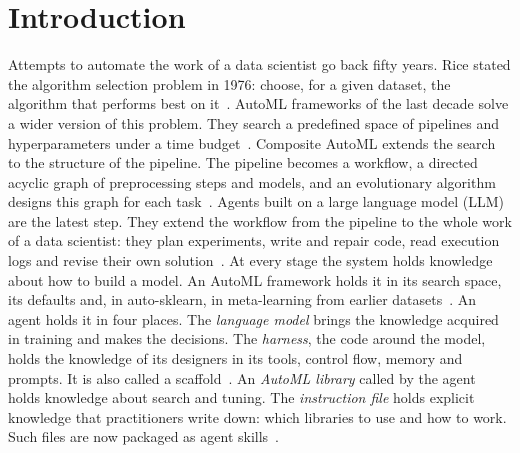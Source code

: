 \section{Introduction}
\label{sec:intro}


Attempts to automate the work of a data scientist go back fifty years.
Rice stated the algorithm selection problem in 1976: choose, for a given
dataset, the algorithm that performs best on it~\citep{rice1976algorithm}.
AutoML frameworks of the last decade solve a wider version of this problem.
They search a predefined space of pipelines and hyperparameters under a time
budget~\citep{thornton2013autoweka,feurer2015autosklearn,he2021automl,gijsbers2024amlb}.
Composite AutoML extends the search to the structure of the pipeline. The
pipeline becomes a workflow, a directed acyclic graph of preprocessing steps
and models, and an evolutionary algorithm designs this graph for each
task~\citep{nikitin2022fedot,revin2023timeseries,nikitin2024sensitivity}. Agents built on a large language model (LLM)
are the latest step. They extend the workflow from the pipeline to the whole
work of a data scientist: they plan experiments, write and repair code, read
execution logs and revise their own solution~\citep{trirat2025automlagent,guo2024dsagent,chan2025mlebench}.
At every stage the system holds knowledge about how to build a model. An
AutoML framework holds it in its search space, its defaults and, in
auto-sklearn, in meta-learning from earlier
datasets~\citep{feurer2015autosklearn}. An agent holds it in four places.
The \emph{language model} brings the knowledge acquired in training and
makes the decisions. The \emph{harness}, the code around the model, holds
the knowledge of its designers in its tools, control flow, memory and
prompts. It is also called a
scaffold~\citep{chan2025mlebench,hu2026beyondmodel}. An \emph{AutoML
library} called by the agent holds knowledge about search and tuning. The
\emph{instruction file} holds explicit knowledge that practitioners write
down: which libraries to use and how to work. Such files are now packaged as
agent skills~\citep{li2026skillsbench}.

